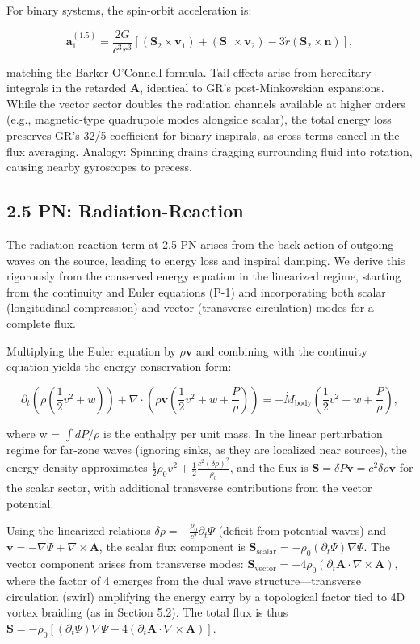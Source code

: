 \documentclass{article}
\begin{document}
For binary systems, the spin-orbit acceleration is:

\[
\mathbf{a}_1^{(1.5)} = \frac{2G}{c^3 r^3} [ (\mathbf{S}_2 \times \mathbf{v}_1) + (\mathbf{S}_1 \times \mathbf{v}_2) - 3 \dot{r} (\mathbf{S}_2 \times \mathbf{n}) ],
\]

matching the Barker-O'Connell formula. Tail effects arise from hereditary integrals in the retarded $\mathbf{A}$, identical to GR's post-Minkowskian expansions. While the vector sector doubles the radiation channels available at higher orders (e.g., magnetic-type quadrupole modes alongside scalar), the total energy loss preserves GR's 32/5 coefficient for binary inspirals, as cross-terms cancel in the flux averaging. Analogy: Spinning drains dragging surrounding fluid into rotation, causing nearby gyroscopes to precess.

\subsection{2.5 PN: Radiation-Reaction}

The radiation-reaction term at 2.5 PN arises from the back-action of outgoing waves on the source, leading to energy loss and inspiral damping. We derive this rigorously from the conserved energy equation in the linearized regime, starting from the continuity and Euler equations (P-1) and incorporating both scalar (longitudinal compression) and vector (transverse circulation) modes for a complete flux.

Multiplying the Euler equation by $\rho \mathbf{v}$ and combining with the continuity equation yields the energy conservation form:

\[
\partial_t \left( \rho \left( \frac{1}{2} v^2 + w \right) \right) + \nabla \cdot \left( \rho \mathbf{v} \left( \frac{1}{2} v^2 + w + \frac{P}{\rho} \right) \right) = - \dot{M}_{\text{body}} \left( \frac{1}{2} v^2 + w + \frac{P}{\rho} \right),
\]

where w = $\int dP / \rho$ is the enthalpy per unit mass. In the linear perturbation regime for far-zone waves (ignoring sinks, as they are localized near sources), the energy density approximates $\frac{1}{2} \rho_0 v^2 + \frac{1}{2} \frac{c^2 (\delta \rho)^2}{\rho_0}$, and the flux is $\mathbf{S} = \delta P \mathbf{v} = c^2 \delta \rho \mathbf{v}$ for the scalar sector, with additional transverse contributions from the vector potential.

Using the linearized relations $\delta \rho = - \frac{\rho_0}{c^2} \partial_t \Psi$ (deficit from potential waves) and $\mathbf{v} = - \nabla \Psi + \nabla \times \mathbf{A}$, the scalar flux component is $\mathbf{S}_{\text{scalar}} = - \rho_0 (\partial_t \Psi) \nabla \Psi$. The vector component arises from transverse modes: $\mathbf{S}_{\text{vector}} = - 4 \rho_0 (\partial_t \mathbf{A} \cdot \nabla \times \mathbf{A})$, where the factor of 4 emerges from the dual wave structure---transverse circulation (swirl) amplifying the energy carry by a topological factor tied to 4D vortex braiding (as in Section 5.2). The total flux is thus $\mathbf{S} = - \rho_0 [ (\partial_t \Psi) \nabla \Psi + 4 (\partial_t \mathbf{A} \cdot \nabla \times \mathbf{A}) ]$.
\end{document}
